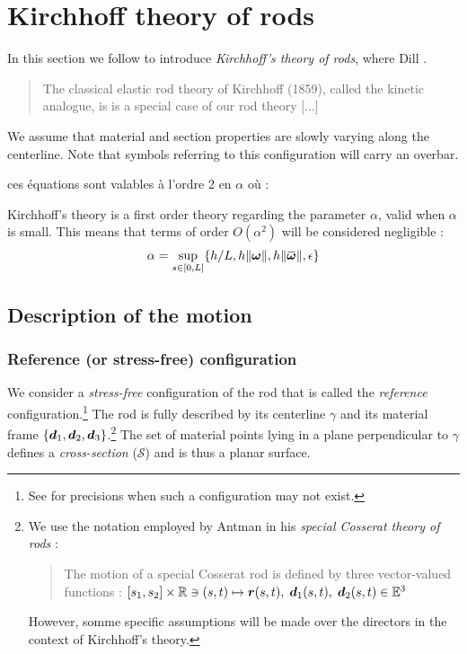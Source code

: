 \clearpage
\section{Kirchhoff theory of rods}

In this section we follow \cite{Dill1992} to introduce \emph{Kirchhoff's theory of rods}, where Dill . \blockcquote[p.~238]{Antman2005}{The classical elastic rod theory of Kirchhoff (1859), called the kinetic analogue, is is a special case of our rod theory [...]}

We assume that material and section properties are slowly varying along the centerline.
Note that symbols referring to this configuration will carry an overbar.

ces équations sont valables à l'ordre 2 en $\alpha$ \cite{Coleman1993} où :

Kirchhoff's theory is a first order theory regarding the parameter $\alpha$, valid when $\alpha$ is small. This means that terms of order $O(\alpha^2)$ will be considered negligible
 :
\begin{equation}
	\alpha = \sup_{s \in [0,L]} \{ h/L, h \norm{\vect{\omega}}, h\norm{\overbar{\vect{\omega}}}, \epsilon \}
\end{equation}

\subsection{Description of the motion}
\subsubsection{Reference (or stress-free) configuration}

We consider a \emph{stress-free} configuration of the rod that is called the \emph{reference} configuration.\footnote{See \cite[p.~20]{Audoly2010} for precisions when such a configuration may not exist.} The rod is fully described by its centerline ${\gamma}$ and its material frame $\{{\boldsymbol{d}_1}, {\boldsymbol{d}_2}, {\boldsymbol{d}_3}\}$.\footnote{We use the notation employed by Antman in his \emph{special Cosserat theory of rods} : \blockcquote[p.~270]{Antman2005}{The motion of a special Cosserat rod is defined by three vector-valued functions : $ [s_1, s_2] \times \mathbb{R} \ni  (s,t) \mapsto \boldsymbol{r}(s,t), \; \boldsymbol{d}_1 (s,t), \; \boldsymbol{d}_2 (s,t) \in \mathbb{E}^3$}. However, somme specific assumptions will be made over the directors in the context of Kirchhoff's theory.} The set of material points lying in a plane perpendicular to ${\gamma}$ defines a \emph{cross-section} ($\mathcal{S}$) and is thus a planar surface. 

